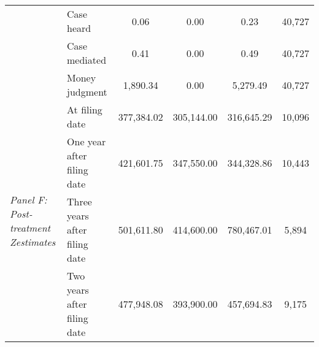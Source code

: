 \begin{tabular}{llcccc}
 & Case heard & 0.06 & 0.00 & 0.23 & 40,727 \\
 & Case mediated & 0.41 & 0.00 & 0.49 & 40,727 \\
 & Money judgment & 1,890.34 & 0.00 & 5,279.49 & 40,727 \\
\cline{1-6}
\multirow[c]{4}{4cm}{\textit{Panel F: Post-treatment Zestimates}} & At filing date & 377,384.02 & 305,144.00 & 316,645.29 & 10,096 \\
 & One year after filing date & 421,601.75 & 347,550.00 & 344,328.86 & 10,443 \\
 & Three years after filing date & 501,611.80 & 414,600.00 & 780,467.01 & 5,894 \\
 & Two years after filing date & 477,948.08 & 393,900.00 & 457,694.83 & 9,175 \\
\cline{1-6}
\bottomrule
\end{tabular}
